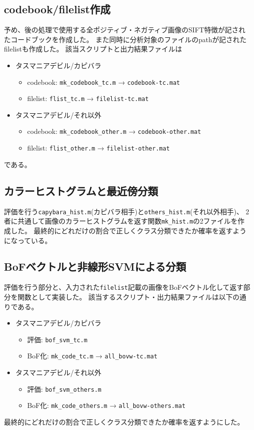 \documentclass[11pt,a4paper, uplatex]{jsreport}
\begin{document}
\subsection{codebook/filelist作成}
予め、後の処理で使用する全ポジティブ・ネガティブ画像のSIFT特徴が記されたコードブックを作成した。
また同時に分析対象のファイルのpathが記されたfilelistも作成した。
該当スクリプトと出力結果ファイルは
\begin{itemize}
  \item タスマニアデビル/カピバラ
  \begin{itemize}
    \item codebook: \texttt{mk_codebook_tc.m} → \texttt{codebook-tc.mat}
    \item filelist: \texttt{flist_tc.m} → \texttt{filelist-tc.mat}
  \end{itemize}
  \item タスマニアデビル/それ以外
  \begin{itemize}
    \item codebook: \texttt{mk_codebook_other.m} → \texttt{codebook-other.mat}
    \item filelist: \texttt{flist_other.m} → \texttt{filelist-other.mat}
  \end{itemize}
\end{itemize}
である。
\subsection{カラーヒストグラムと最近傍分類}
評価を行う\texttt{capybara_hist.m}(カピバラ相手)と\texttt{others_hist.m}(それ以外相手)、
2者に共通して画像のカラーヒストグラムを返す関数\texttt{mk_hist.m}の2ファイルを作成した。
最終的にどれだけの割合で正しくクラス分類できたか確率を返すようになっている。
\subsection{BoFベクトルと非線形SVMによる分類}
評価を行う部分と、入力された\texttt{filelist}記載の画像をBoFベクトル化して返す部分を関数として実装した。
該当するスクリプト・出力結果ファイルは以下の通りである。
\begin{itemize}
  \item タスマニアデビル/カピバラ
  \begin{itemize}
    \item 評価: \texttt{bof_svm_tc.m}
    \item BoF化: \texttt{mk_code_tc.m} → \texttt{all_bovw-tc.mat}
  \end{itemize}
  \item タスマニアデビル/それ以外
  \begin{itemize}
    \item 評価: \texttt{bof_svm_others.m}
    \item BoF化: \texttt{mk_code_others.m} → \texttt{all_bovw-others.mat}
  \end{itemize}
\end{itemize}
最終的にどれだけの割合で正しくクラス分類できたか確率を返すようにした。
\end{document}
